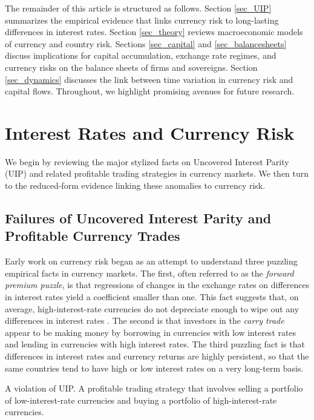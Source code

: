 \documentclass{ar-1col}
\begin{document}
The remainder of this article is structured as follows. Section \ref{sec_UIP} summarizes the empirical evidence that links currency risk to long-lasting differences in interest rates. Section \ref{sec_theory} reviews macroeconomic models of currency and country risk. Sections \ref{sec_capital} and \ref{sec_balancesheets} discuss implications for capital accumulation, exchange rate regimes, and currency risks on the balance sheets of firms and sovereigns.  Section \ref{sec_dynamics} discusses the link between time variation in currency risk and capital flows. Throughout, we highlight promising avenues for future research.


\section{Interest Rates and Currency Risk \label{sec_UIP}}

We begin by reviewing the major stylized facts on Uncovered Interest Parity (UIP) and related profitable trading strategies in currency markets. We then turn to the reduced-form evidence linking these anomalies to currency risk. 

\subsection{Failures of
  Uncovered Interest Parity and Profitable Currency Trades }

Early work on currency risk began as an attempt to understand three puzzling empirical facts in currency markets. The first, often referred to as the \textit{forward premium puzzle}, is that regressions of changes in the exchange rates on differences in interest rates yield a coefficient smaller than one. This fact suggests that, on average, high-interest-rate currencies do not depreciate enough to wipe out any differences in interest rates \citep{Bilson1981, Fama1984}. The second is that investors in the \textit{carry trade} appear to be making money by borrowing in currencies with low interest rates and lending in currencies with high interest rates. The third puzzling fact is that differences in interest rates and currency returns are highly persistent, so that the same countries tend to have high or low interest rates on a very long-term basis.

\begin{marginnote}[]
   {A violation of UIP. A profitable trading strategy that involves selling a portfolio of low-interest-rate currencies and buying a portfolio of high-interest-rate currencies.} 
\end{marginnote}
\end{document}
